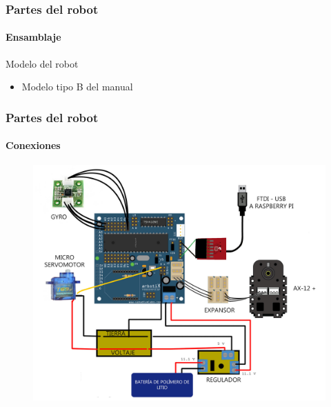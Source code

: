 \documentclass{beamer}
\begin{document}
\begin{frame}
\frametitle{Partes del robot}
\framesubtitle{Ensamblaje}

\begin{block}{Modelo del robot}
	\begin{itemize}
		\item Modelo tipo B del manual	
	\end{itemize}
\end{block}

\end{frame}

\begin{frame}
\frametitle{Partes del robot}
\framesubtitle{Conexiones}


\begin{figure}[hbtp]
\centering
\includegraphics[scale=0.1]{arbotix_servo.jpg} 
\end{figure}

\end{frame}
\end{document}
